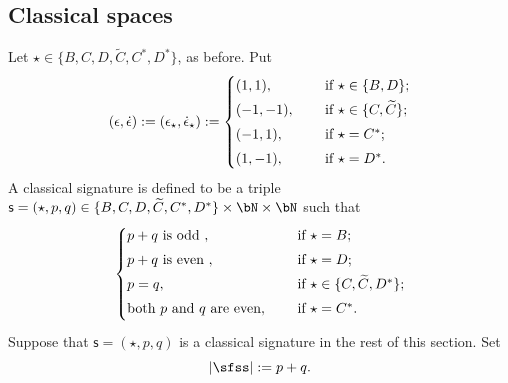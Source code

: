 \documentclass[11pt,a4paper]{amsart}
\def\abs#1{\left|{#1}\right|}
\newcommand{\be}{\begin {equation}}
\newcommand{\ee}{\end {equation}}
\numberwithin{equation}{section}
\theoremstyle{remark}
\begin{document}
\subsection{Classical spaces}\label{classical}
Let $\star\in \{B,C,D, \widetilde C, C^*, D^*\}$, as before. Put
\be\label{epsilond}
(\epsilon, \dot \epsilon):=(\epsilon_\star, \dot \epsilon_\star):=\begin{cases}
  (1,1),&\quad \textrm{ if  $\star\in \{B,D\}$;} \smallskip \\
 (-1,-1),&\quad \textrm{ if  $\star\in \{C,\widetilde C\}$;} \smallskip \\
 (-1,1),&\quad \textrm{ if  $\star=C^*$;} \smallskip \\
 (1,-1),&\quad \textrm{ if  $\star=D^*$.}
 \end{cases}
\ee
A classical signature is defined to be a triple  $\mathsf s=(\star, p,q)\in  \{B,C,D, \widetilde C, C^*, D^*\}\times \bN\times \bN$ such that
\[
\begin{cases}
  p+q\textrm{ is odd },&\quad \textrm{ if  $\star=B$;} \smallskip \\
   p+q\textrm{ is even },&\quad \textrm{ if  $\star=D$;} \smallskip \\
 p=q,&\quad \textrm{ if  $\star\in \{C,\widetilde C, D^*\}$;} \smallskip \\
\textrm{both $p$ and $q$ are even} ,&\quad \textrm{ if  $\star=C^*$.} \smallskip \\
 \end{cases}
\]
 Suppose that $\mathsf s=(\star, p,q)$ is a classical  signature in the rest of this section.
Set
\begin{equation}\label{eq:abss}
  \abs{\sfss}:=p+q.
\end{equation}
\end{document}
